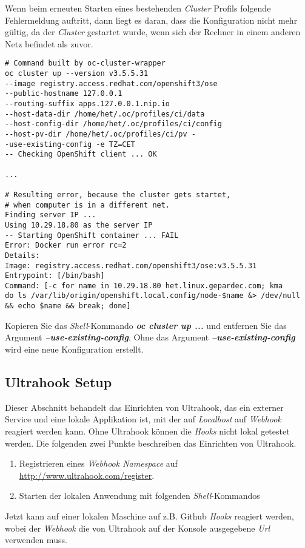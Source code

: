 Wenn beim erneuten Starten eines bestehenden \emph{Cluster} Profils folgende Fehlermeldung auftritt, dann liegt es daran, dass die Konfiguration nicht mehr gültig, da der \emph{Cluster} gestartet wurde, wenn sich der Rechner in einem anderen Netz befindet als zuvor.
\begin{verbatim}
# Command built by oc-cluster-wrapper
oc cluster up --version v3.5.5.31 
--image registry.access.redhat.com/openshift3/ose 
--public-hostname 127.0.0.1 
--routing-suffix apps.127.0.0.1.nip.io 
--host-data-dir /home/het/.oc/profiles/ci/data 
--host-config-dir /home/het/.oc/profiles/ci/config 
--host-pv-dir /home/het/.oc/profiles/ci/pv -
-use-existing-config -e TZ=CET                                                                                                 
-- Checking OpenShift client ... OK   

...

# Resulting error, because the cluster gets startet, 
# when computer is in a different net.
Finding server IP ... 
Using 10.29.18.80 as the server IP
-- Starting OpenShift container ... FAIL
Error: Docker run error rc=2
Details:
Image: registry.access.redhat.com/openshift3/ose:v3.5.5.31
Entrypoint: [/bin/bash]
Command: [-c for name in 10.29.18.80 het.linux.gepardec.com; kma
do ls /var/lib/origin/openshift.local.config/node-$name &> /dev/null 
&& echo $name && break; done]
\end{verbatim}
Kopieren Sie das \emph{Shell}-Kommando \textbf{\emph{oc cluster up ...}} und entfernen Sie das Argument \textbf{\emph{--use-existing-config}}. Ohne das Argument \textbf{\emph{--use-existing-config}} wird eine neue Konfiguration erstellt.

\subsection{Ultrahook Setup}
Dieser Abschnitt behandelt das Einrichten von Ultrahook, das ein externer Service und eine lokale Applikation ist, mit der auf \emph{Localhost} auf \emph{Webhook} reagiert werden kann. Ohne Ultrahook können die \emph{Hooks} nicht lokal getestet werden. Die folgenden zwei Punkte beschreiben das Einrichten von Ultrahook.

\begin{enumerate}
	\item Registrieren eines \emph{Webhook Namespace} auf \url{http://www.ultrahook.com/register}.
	\item Starten der lokalen Anwendung mit folgenden \emph{Shell}-Kommandos\\
\end{enumerate}
Jetzt kann auf einer lokalen Maschine auf z.B. Github \emph{Hooks} reagiert werden, wobei der \emph{Webhook} die von Ultrahook auf der Konsole ausgegebene \emph{Url} verwenden muss.